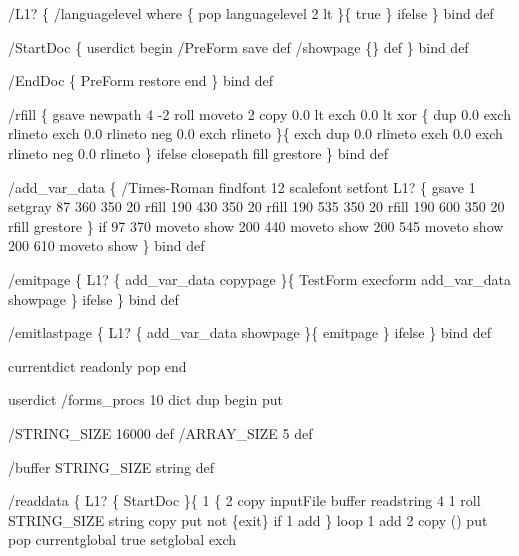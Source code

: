 \documentclass[11pt]{article}
\begin{document}
/L1? \{
    /languagelevel where \{
       pop languagelevel 2 lt
    \}\{
       true
    \} ifelse
\} bind def

/StartDoc \{ 
    userdict begin 
    /PreForm save def 
    /showpage \{\} def
\} bind def

/EndDoc \{ 
    PreForm restore 
    end %
\} bind def

/rfill \{ %
    gsave newpath 
    4 -2 roll moveto %
    2 copy 0.0 lt exch 0.0 lt xor \{ %
        dup 0.0 exch rlineto %
        exch 0.0 rlineto 
        neg 0.0 exch rlineto
    \}\{ 
        exch dup 0.0 rlineto %
        exch 0.0 exch rlineto
        neg 0.0 rlineto
    \} ifelse
    closepath
    fill grestore
\} bind def

/add_var_data \{ %
    /Times-Roman findfont 12 scalefont setfont 
    L1? \{ %
        gsave
        1 setgray
        87 360 350 20 rfill
        190 430 350 20 rfill
        190 535 350 20 rfill
        190 600 350 20 rfill
        grestore
    \} if
    97 370 moveto show
    200 440 moveto show
    200 545 moveto show
    200 610 moveto show
\} bind def

/emitpage \{ 
    L1? \{
       add_var_data copypage
    \}\{
       TestForm execform add_var_data showpage
    \} ifelse
\} bind def

/emitlastpage \{
    L1? \{
       add_var_data showpage
    \}\{
       emitpage
    \} ifelse
\} bind def

currentdict readonly pop end

userdict /forms_procs 10 dict dup begin put

/STRING_SIZE 16000 def
/ARRAY_SIZE 5 def %

/buffer STRING_SIZE string def 

/readdata \{
  L1? \{ %
      StartDoc
  \}\{    %
      1 \{                             %
          2 copy                      %
          inputFile buffer readstring %
          4 1 roll                    %
          STRING_SIZE string copy     %
          put                         %
          not \{exit\} if               %
          1 add                       %
        \} loop
      1 add 2 copy () put pop
      currentglobal true setglobal exch
\end{document}
